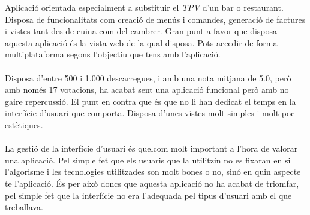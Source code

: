 Aplicació\cite{ordersev} orientada especialment a substituir el \textit{TPV} d'un bar o restaurant. Disposa de funcionalitats com creació de menús i comandes, generació de factures i vistes tant des de cuina com del cambrer. Gran punt a favor que disposa aquesta aplicació és la vista web de la qual disposa. Pots accedir de forma multiplataforma segons l'objectiu que tens amb l'aplicació.
\\\\
Disposa d'entre 500 i 1.000 descarregues, i amb una nota mitjana de 5.0, però amb només 17 votacions, ha acabat sent una aplicació funcional però amb no gaire repercussió. El punt en contra que és que no li han dedicat el temps en la interfície d'usuari que comporta. Disposa d'unes vistes molt simples i molt poc estètiques.
\\\\
La gestió de la interfície d'usuari és quelcom molt important a l'hora de valorar una aplicació. Pel simple fet que els usuaris que la utilitzin no es fixaran en si l'algorisme i les tecnologies utilitzades son molt bones o no, sinó en quin aspecte te l'aplicació. És per això doncs que aquesta aplicació no ha acabat de triomfar, pel simple fet que la interfície no era l'adequada pel tipus d'usuari amb el que treballava.
\\
